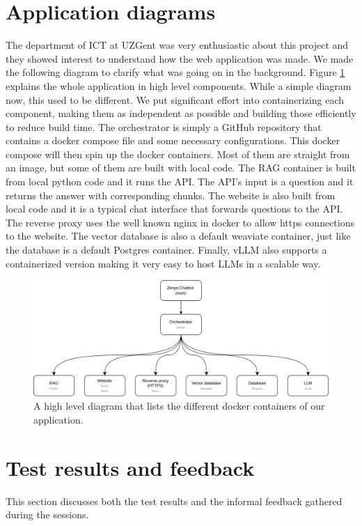 \section{Application diagrams}
The department of ICT at UZGent was very enthusiastic about this project and they showed interest to understand how the web application was made. We made the following diagram to clarify what was going on in the background. Figure \ref{fig:architecture_docker} explains the whole application in high level components. While a simple diagram now, this used to be different. We put significant effort into containerizing each component, making them as independent as possible and building those efficiently to reduce build time. The orchestrator is simply a GitHub repository that contains a docker compose file and some necessary configurations. This docker compose will then spin up the docker containers. Most of them are straight from an image, but some of them are built with local code. The RAG container is built from local python code and it runs the API. The API's input is a question and it returns the answer with corresponding chunks. The website is also built from local code and it is a typical chat interface that forwards questions to the API. The reverse proxy uses the well known nginx in docker to allow https connections to the website. The vector database is also a default weaviate container, just like the database is a default Postgres container. Finally, vLLM also supports a containerized version making it very easy to host LLMs in a scalable way.

\begin{figure}[H]
    \captionsetup{justification=centering}
    \centerline{\includegraphics[width=1\linewidth]{fig/Architecture Docker.png}}
    \caption{A high level diagram that lists the different docker containers of our application.}
    \label{fig:architecture_docker}
\end{figure}

\section{Test results and feedback}
This section discusses both the test results and the informal feedback gathered during the sessions.

